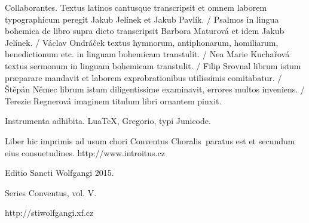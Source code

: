 \documentclass[a4paper, twoside, 12pt]{article}
\newcommand{\annusEditionis}{2015}
\begin{document}
Collaborantes.
Textus latinos cantusque transcripsit et omnem laborem typographicum peregit
Jakub Jelínek et Jakub Pavlík. /
Psalmos in lingua bohemica de libro supra dicto transcripsit
Barbora Maturová et idem Jakub Jelínek. /
Václav Ondráček textus hymnorum, antiphonarum, homiliarum, benedictionum etc.
in linguam bohemicam transtulit. /
Nea Marie Kuchařová textus sermonum in linguam bohemicam transtulit. /
Filip Srovnal librum istum præparare mandavit et laborem exprobrationibus
utilissimis comitabatur. /
Štěpán Němec librum istum diligentissime examinavit, errores multos
inveniens. /
Terezie Regnerová imaginem titulum libri ornantem pinxit.

Instrumenta adhibita.
LuaTeX, %
Gregorio, %
typi Junicode. %

\begin{center}
Liber hic imprimis ad usum chori
\guillemotright Conventus Choralis\guillemotleft\
paratus est
et secundum eius consuetudines.
http://www.introitus.cz

\vfill

{\large Editio Sancti Wolfgangi \annusEditionis.}

\vfill

Series \guillemotright Conventus\guillemotleft, vol. V.

\vfill

http://stiwolfgangi.xf.cz

\end{center}

\vfill
\end{document}
